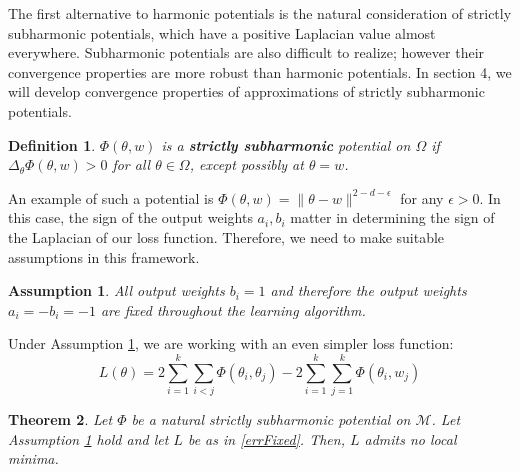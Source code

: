 \documentclass{article}
\newtheorem{theorem}{Theorem}[section]
\newtheorem{definition}[theorem]{Definition}
\newtheorem{assumption}{Assumption}
\begin{document}
The first alternative to harmonic potentials is the natural consideration of strictly subharmonic potentials, which have a positive Laplacian value almost everywhere. Subharmonic potentials are also difficult to realize; however their convergence properties are more robust than harmonic potentials. In section 4, we will develop convergence properties of approximations of strictly subharmonic potentials.
%
\begin{definition}
$\Phi(\theta,w)$ is a {\bf strictly subharmonic} potential on $\Omega$ if $\Delta_\theta \Phi(\theta,w) > 0$ for all $\theta \in \Omega$, except possibly at $\theta = w$.
\end{definition}


An example of such a potential is $\Phi(\theta, w) = \|\theta -w \|^{2-d-\epsilon}$ for any $\epsilon > 0$. In this case, the sign of the output weights $a_i, b_i$ matter in determining the sign of the Laplacian of our loss function. Therefore, we need to make suitable assumptions in this framework.
%
\begin{assumption}
\label{outputFixed}
All output weights $b_i = 1$ and therefore the output weights  $a_i = - b_i = -1$ are fixed throughout the learning algorithm. 
\end{assumption}
%
Under Assumption \ref{outputFixed}, we are working with an even simpler loss function:
\begin{equation}\label{errFixed}
L(\theta) =  2\sum_{i=1}^k\sum_{i < j} \Phi(\theta_i,\theta_j) - 2\sum_{i=1}^k\sum_{j=1}^k\Phi(\theta_i,w_j)
\end{equation}
%
\begin{theorem}\label{subStrict}
Let $\Phi$ be a natural strictly subharmonic potential on $\mathcal{M}$. Let Assumption \ref{outputFixed} hold and let $L$ be as in \eqref{errFixed}. Then, $L$ admits no local minima. 
\end{theorem}
%
\end{document}
